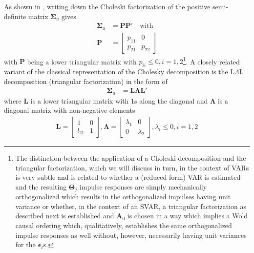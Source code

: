 \documentclass[a4paper,11pt,listof=nochaptergap,oneside,pointednumbers,bibtotoc,bigheadings,liststotoc,hidelinks]{scrbook}
\theoremstyle{mysatz}
\theoremstyle{mydefinition}
\theoremstyle{mytheorem}
\theoremstyle{mybemerkung}
\newcommand{\vect}[1]{\boldsymbol{\mathbf{#1}}}
\begin{document}
As shown in \citet{zivot:00}, writing down the Choleski factorization of the positive semi-definite matrix $\vect{\Sigma}_u$ gives
\begin{equation} \label{eq:svar14}
\begin{split}
 		\vect{\Sigma}_u & = \vect{P}\vect{P'} \quad \text{with} \\
		\vect{P} & = \begin{bmatrix}
    							p_{11} & 0 \\
							p_{21} & p_{22}
 							\end{bmatrix}
\end{split}								
\end{equation}
with $\vect{P}$ being a lower triangular matrix with $p_{ii} \leq 0, i = 1, 2$\footnote{The distinction between the application of a Choleski decomposition and the triangular factorization, which we will discuss in turn, in the context of VARs is very subtle and is related to whether a (reduced-form) VAR is estimated and the resulting $\vect{\Theta}_j$ impulse responses are simply mechanically orthogonalized which results in the orthogonalized impulses having unit variance or whether, in the context of an SVAR, a triangular factorization as described next is established and $\vect{A}_0$ is chosen in a way which implies a Wold causal ordering which, qualitatively, establishes the same orthogonalized impulse responses as well without, however, necessarily having unit variances for the $\vect{\epsilon}_t$s.}. A closely related variant \citep{zivot:00} of the classical representation of the Cholesky decomposition is the L$\Lambda$L decomposition (triangular factorization) in the form of 
\begin{equation} \label{eq:svar15}
\begin{split}
 		\vect{\Sigma}_u & = \vect{L}\vect{\Lambda}\vect{L'}
\end{split}								
\end{equation}
where $\vect{L}$ is a lower triangular matrix with $1$s along the diagonal and $\vect{\Lambda}$ is a diagonal matrix with non-negative elements
\begin{equation} \label{eq:svar16}
\begin{split}
	\vect{L} =  \begin{bmatrix}
    				1 & 0 \\
				l_{21} & 1 
 				\end{bmatrix}, 
				\vect{\Lambda} = 
					\begin{bmatrix}
    					\lambda_1 & 0 \\
					0 & \lambda_2 
 					\end{bmatrix},
					\lambda_i \leq 0, i = 1, 2
\end{split}								
\end{equation}
\end{document}
